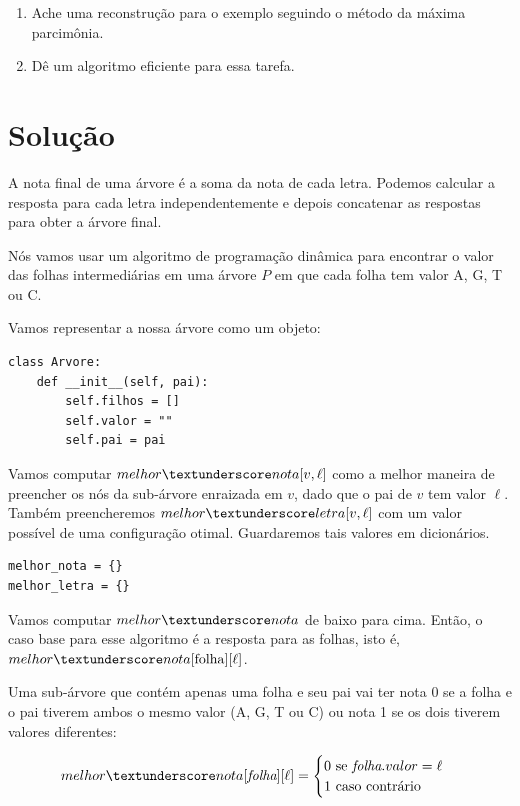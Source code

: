 \documentclass[11pt]{article}
\newcommand{\tu}{\textunderscore}
\begin{document}
\begin{enumerate}
\item Ache uma reconstrução para o exemplo seguindo o método da
máxima parcimônia.
\item Dê um algoritmo eficiente para essa tarefa.
\end{enumerate}

\section{Solução}
\label{sec-2}

A nota final de uma árvore é a soma da nota de cada letra. Podemos
calcular a resposta para cada letra independentemente e depois
concatenar as respostas para obter a árvore final.

Nós vamos usar um algoritmo de programação dinâmica para encontrar o
valor das folhas intermediárias em uma árvore $P$ em que cada
folha tem valor A, G, T ou C.

Vamos representar a nossa árvore como um objeto:
\begin{verbatim}
class Arvore:
    def __init__(self, pai):
        self.filhos = []
        self.valor = ""
        self.pai = pai
\end{verbatim}

Vamos computar $melhor\tu nota[v, \ell]$ como a melhor maneira de
preencher os nós da sub-árvore enraizada em $v$, dado que o pai de $v$
tem valor $\ell$. Também preencheremos $melhor \tu letra[v, \ell]$ com um valor possível
de uma configuração otimal. Guardaremos tais valores em dicionários.

\begin{verbatim}
melhor_nota = {}
melhor_letra = {}
\end{verbatim}

Vamos computar $melhor \tu nota$ de baixo para cima. Então, o caso base
para esse algoritmo é a resposta para as folhas, isto é, $melhor\tu nota[\mathrm{folha}][\ell]$.

Uma sub-árvore que contém apenas uma folha e seu pai vai ter
nota 0 se a folha e o pai tiverem ambos o mesmo valor (A,
G, T ou C) ou nota 1 se os dois tiverem valores diferentes:

\[melhor \tu nota[\textit{folha}][\ell] = \begin{cases}0 \text{ se } \textit{folha}.valor = \ell \\
                                                       1 \text{ caso contrário}\end{cases}\]
\end{document}
